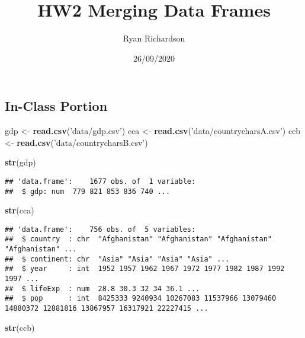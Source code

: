 \documentclass[
]{article}
\title{HW2 Merging Data Frames}
\author{Ryan Richardson}
\date{26/09/2020}
\newenvironment{Shaded}{\begin{snugshade}}{\end{snugshade}}
\newcommand{\KeywordTok}[1]{\textcolor[rgb]{0.13,0.29,0.53}{\textbf{#1}}}
\newcommand{\NormalTok}[1]{#1}
\newcommand{\StringTok}[1]{\textcolor[rgb]{0.31,0.60,0.02}{#1}}
\begin{document}
\maketitle

\hypertarget{in-class-portion}{%
\subsection{In-Class Portion}\label{in-class-portion}}

\begin{Shaded}
\begin{Highlighting}[]
\NormalTok{gdp <-}\StringTok{ }\KeywordTok{read.csv}\NormalTok{(}\StringTok{'data/gdp.csv'}\NormalTok{)}
\NormalTok{cca <-}\StringTok{ }\KeywordTok{read.csv}\NormalTok{(}\StringTok{'data/countrycharsA.csv'}\NormalTok{)}
\NormalTok{ccb <-}\StringTok{ }\KeywordTok{read.csv}\NormalTok{(}\StringTok{'data/countrycharsB.csv'}\NormalTok{)}
\end{Highlighting}
\end{Shaded}

\begin{Shaded}
\begin{Highlighting}[]
\KeywordTok{str}\NormalTok{(gdp)}
\end{Highlighting}
\end{Shaded}

\begin{verbatim}
## 'data.frame':    1677 obs. of  1 variable:
##  $ gdp: num  779 821 853 836 740 ...
\end{verbatim}

\begin{Shaded}
\begin{Highlighting}[]
\KeywordTok{str}\NormalTok{(cca)}
\end{Highlighting}
\end{Shaded}

\begin{verbatim}
## 'data.frame':    756 obs. of  5 variables:
##  $ country  : chr  "Afghanistan" "Afghanistan" "Afghanistan" "Afghanistan" ...
##  $ continent: chr  "Asia" "Asia" "Asia" "Asia" ...
##  $ year     : int  1952 1957 1962 1967 1972 1977 1982 1987 1992 1997 ...
##  $ lifeExp  : num  28.8 30.3 32 34 36.1 ...
##  $ pop      : int  8425333 9240934 10267083 11537966 13079460 14880372 12881816 13867957 16317921 22227415 ...
\end{verbatim}

\begin{Shaded}
\begin{Highlighting}[]
\KeywordTok{str}\NormalTok{(ccb)}
\end{Highlighting}
\end{Shaded}
\end{document}
